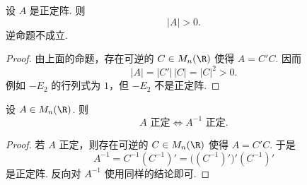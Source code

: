 \begin{corollary}
	设 $A$ 是正定阵. 则
	\[
	|A|>0.
	\]
	逆命题不成立.
\end{corollary}

\begin{proof}
	由上面的命题，存在可逆的 $C\in M_n(\R)$ 使得 $A=C'C$. 因而
	\[
	|A|=|C'|\,|C|=|C|^2>0.
	\]
	例如 $-E_2$ 的行列式为 $1$，但 $-E_2$ 不是正定阵.
\end{proof}

\begin{proposition}
	设 $A\in M_n(\R)$. 则
	\[
	A\text{ 正定}\Longleftrightarrow A^{-1}\text{ 正定}.
	\]
\end{proposition}

\begin{proof}
	若 $A$ 正定，则存在可逆的 $C\in M_n(\R)$ 使得 $A=C'C$. 于是
	\[
	A^{-1}=C^{-1}(C^{-1})'
	=\bigl((C^{-1})'\bigr)'(C^{-1})'
	\]
	是正定阵. 反向对 $A^{-1}$ 使用同样的结论即可.
\end{proof}

